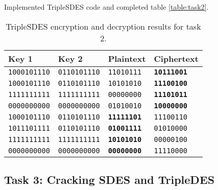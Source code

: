 \documentclass[a4paper,english,12pt]{article}
\begin{document}
Implemented TripleSDES code and completed table \vref{table:task2}.

\begin{table}
  \centering
  \begin{tabular}{@{}llll@{}}
    \toprule
      Key 1 &
      Key 2 &
      Plaintext &
      Ciphertext \\
    \midrule

             \texttt{1000101110} &
             \texttt{0110101110} &
               \texttt{11010111} &
       \texttt{\textbf{10111001}} \\

            \texttt{1000101110} &
            \texttt{0110101110} &
              \texttt{10101010} &
      \texttt{\textbf{11100100}} \\

            \texttt{1111111111} &
            \texttt{1111111111} &
              \texttt{00000000} &
      \texttt{\textbf{11101011}} \\

            \texttt{0000000000} &
            \texttt{0000000000} &
              \texttt{01010010} &
      \texttt{\textbf{10000000}} \\

            \texttt{1000101110} &
            \texttt{0110101110} &
      \texttt{\textbf{11111101}} &
              \texttt{11100110} \\

             \texttt{1011101111} &
             \texttt{0110101110} &
       \texttt{\textbf{01001111}} &
               \texttt{01010000} \\

            \texttt{1111111111} &
            \texttt{1111111111} &
      \texttt{\textbf{10101010}} &
              \texttt{00000100} \\

            \texttt{0000000000} &
            \texttt{0000000000} &
      \texttt{\textbf{00000000}} &
              \texttt{11110000} \\
      \bottomrule
  \end{tabular}
  \caption{TripleSDES encryption and decryption results for task 2.}
  \label{table:task2}
\end{table}

\subsection{Task 3: Cracking SDES and TripleDES}
\end{document}
